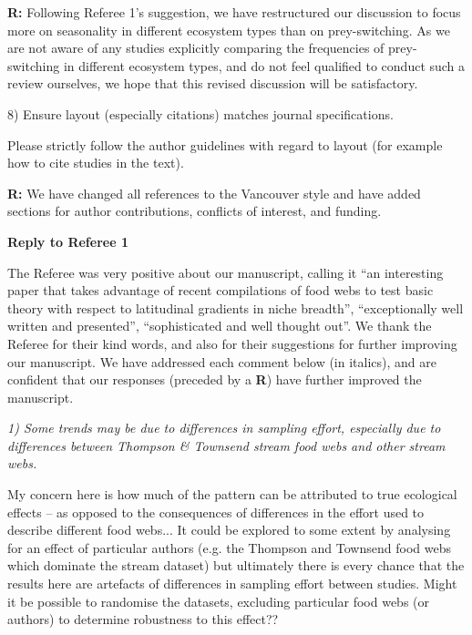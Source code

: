 \documentclass[12pt]{letter}
\newenvironment{refquote}{\bigskip \begin{it}}{\end{it}\smallskip}
\begin{document}
  \textbf{R:} Following Referee 1's suggestion, we have 
    restructured our discussion
    to focus more on seasonality in different ecosystem types than on prey-switching.
    As we are not aware of any studies explicitly comparing the frequencies of 
    prey-switching in different ecosystem types, and do not feel qualified to conduct
    such a review ourselves, we hope that this revised discussion will be satisfactory.


  8) Ensure layout (especially citations) matches journal specifications.

  \begin{refquote}

    Please strictly follow the author guidelines with regard to layout (for
    example how to cite studies in the text).

  \end{refquote}

  \textbf{R:} We have changed all references to the Vancouver style and have 
    added sections for author contributions, conflicts of interest, and funding.

  \newpage

{\Large \bf Reply to Referee 1}

  The Referee was very positive about our manuscript, calling it
  ``an interesting paper that takes advantage of recent compilations
  of food webs to test basic theory with respect to latitudinal gradients in
  niche breadth'', ``exceptionally well written and presented'', ``sophisticated
  and well thought out''. We thank the Referee for their kind words,
  and also for their suggestions for further improving our manuscript. We
  have addressed each comment below (in italics), and are confident that our
  responses (preceded by a \textbf{R}) have further improved the manuscript.
  

  \emph{
  1) Some trends may be due to differences in sampling effort, especially
  due to differences between Thompson \& Townsend stream food webs and other
  stream webs.}


  \begin{refquote}

    My concern here is how much of the pattern can be attributed to true
    ecological effects – as opposed to the consequences of differences in the
    effort used to describe different food webs... It could be explored to some extent by
    analysing for an effect of particular authors (e.g. the Thompson and
    Townsend food webs which dominate the stream dataset) but ultimately there
    is every chance that the results here are artefacts of differences in
    sampling effort between studies. Might it be possible to randomise the
    datasets, excluding particular food webs (or authors) to determine
    robustness to this effect?? 

  \end{refquote}
\end{document}
